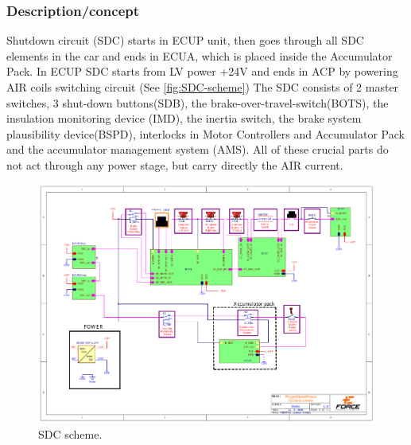 
\subsubsection{Description/concept}

Shutdown circuit (SDC) starts in ECUP unit, then goes through all SDC elements in the car and
ends in ECUA, which is placed inside the Accumulator Pack. In ECUP SDC starts from LV
power +24V and ends in ACP by powering AIR coils switching circuit (See \ref{fig:SDC-scheme}) The SDC consists of 2 master switches, 3 shut-down buttons(SDB), the brake-over-travel-switch(BOTS), the insulation monitoring device (IMD), the inertia switch, the
brake system plausibility device(BSPD), interlocks in Motor Controllers and Accumulator Pack
and the accumulator management system (AMS). All of these crucial parts do not act through
any power stage, but carry directly the AIR current.

\begin{figure}[H]
	\includegraphics[width=\textwidth]{./img/sdc-scheme.pdf}
	\caption{SDC scheme.}
	\label{fig:SDC-schema}
\end{figure}

